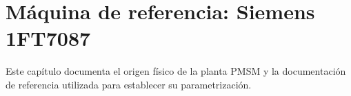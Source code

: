 \section{Máquina de referencia: Siemens 1FT7087}

Este capítulo documenta el origen físico de la planta PMSM y la documentación de referencia utilizada para establecer su parametrización.
